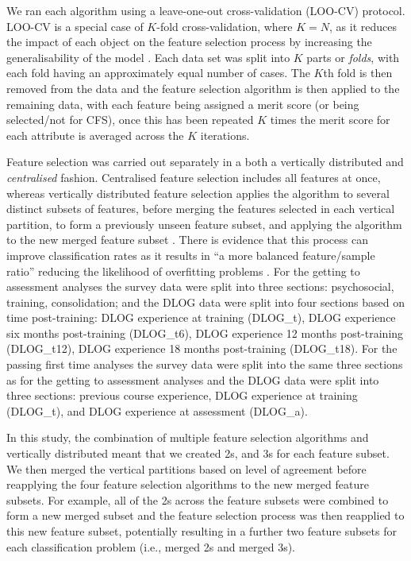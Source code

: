 \documentclass[
  12pt,
  a4paper,
]{book}
\begin{document}
We ran each algorithm using a leave-one-out cross-validation (LOO-CV) protocol. LOO-CV is a special case of \(K\)-fold cross-validation, where \(K = N\), as it reduces the impact of each object on the feature selection process by increasing the generalisability of the model \citep{Hastie2009, DeRooij2020}. Each data set was split into \(K\) parts or \emph{folds}, with each fold having an approximately equal number of cases. The \(K\)th fold is then removed from the data and the feature selection algorithm is then applied to the remaining data, with each feature being assigned a merit score (or being selected/not for CFS), once this has been repeated \(K\) times the merit score for each attribute is averaged across the \(K\) iterations.

Feature selection was carried out separately in a both a vertically distributed and \emph{centralised} fashion. Centralised feature selection includes all features at once, whereas vertically distributed feature selection applies the algorithm to several distinct subsets of features, before merging the features selected in each vertical partition, to form a previously unseen feature subset, and applying the algorithm to the new merged feature subset \citep[see][]{Bolon-Canedo2015}. There is evidence that this process can improve classification rates as it results in ``a more balanced feature/sample ratio'' reducing the likelihood of overfitting problems \citep[p 137]{Bolon-Canedo2015a}. For the getting to assessment analyses the survey data were split into three sections: psychosocial, training, consolidation; and the DLOG data were split into four sections based on time post-training: DLOG experience at training (DLOG\_t), DLOG experience six months post-training (DLOG\_t6), DLOG experience 12 months post-training (DLOG\_t12), DLOG experience 18 months post-training (DLOG\_t18). For the passing first time analyses the survey data were split into the same three sections as for the getting to assessment analyses and the DLOG data were split into three sections: previous course experience, DLOG experience at training (DLOG\_t), and DLOG experience at assessment (DLOG\_a).

In this study, the combination of multiple feature selection algorithms and vertically distributed meant that we created 2s, and 3s for each feature subset. We then merged the vertical partitions based on level of agreement before reapplying the four feature selection algorithms to the new merged feature subsets. For example, all of the 2s across the feature subsets were combined to form a new merged subset and the feature selection process was then reapplied to this new feature subset, potentially resulting in a further two feature subsets for each classification problem (i.e., merged 2s and merged 3s).
\end{document}
